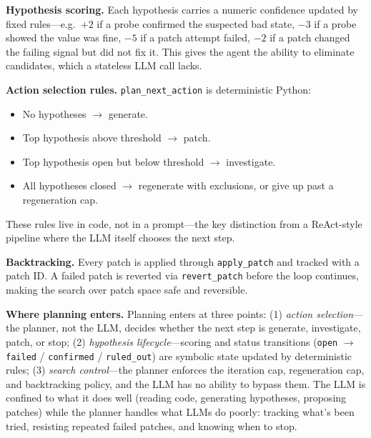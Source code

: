 \documentclass[11pt]{article}
\begin{document}
\textbf{Hypothesis scoring.} Each hypothesis carries a numeric confidence updated by fixed rules---e.g.\ $+2$ if a probe confirmed the suspected bad state, $-3$ if a probe showed the value was fine, $-5$ if a patch attempt failed, $-2$ if a patch changed the failing signal but did not fix it. This gives the agent the ability to eliminate candidates, which a stateless LLM call lacks.

\textbf{Action selection rules.} \texttt{plan\_next\_action} is deterministic Python:
\begin{itemize}
    \item No hypotheses $\rightarrow$ generate.
    \item Top hypothesis above threshold $\rightarrow$ patch.
    \item Top hypothesis open but below threshold $\rightarrow$ investigate.
    \item All hypotheses closed $\rightarrow$ regenerate with exclusions, or give up past a regeneration cap.
\end{itemize}
These rules live in code, not in a prompt---the key distinction from a ReAct-style pipeline where the LLM itself chooses the next step.

\textbf{Backtracking.} Every patch is applied through \texttt{apply\_patch} and tracked with a patch ID. A failed patch is reverted via \texttt{revert\_patch} before the loop continues, making the search over patch space safe and reversible.

\textbf{Where planning enters.} Planning enters at three points: (1) \emph{action selection}---the planner, not the LLM, decides whether the next step is generate, investigate, patch, or stop; (2) \emph{hypothesis lifecycle}---scoring and status transitions (\texttt{open} $\rightarrow$ \texttt{failed} / \texttt{confirmed} / \texttt{ruled\_out}) are symbolic state updated by deterministic rules; (3) \emph{search control}---the planner enforces the iteration cap, regeneration cap, and backtracking policy, and the LLM has no ability to bypass them. The LLM is confined to what it does well (reading code, generating hypotheses, proposing patches) while the planner handles what LLMs do poorly: tracking what's been tried, resisting repeated failed patches, and knowing when to stop.
\end{document}
